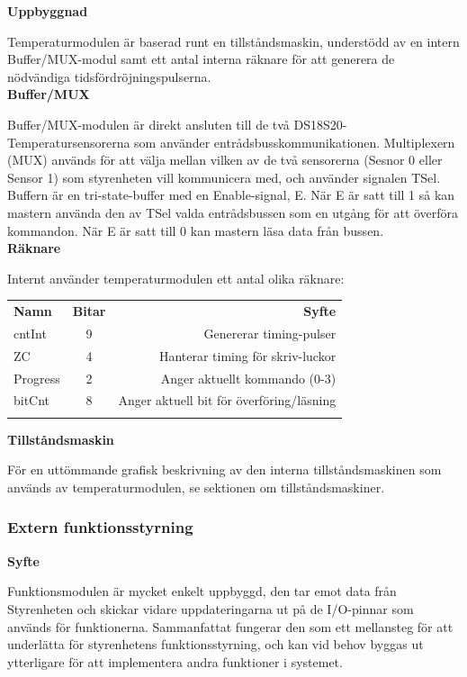 \documentclass[a4paper,11pt]{article}
\begin{document}
{\noindent \bf Uppbyggnad}

Temperaturmodulen är baserad runt en tillståndsmaskin, understödd av en intern Buffer/MUX-modul samt 
ett antal interna räknare för att generera de nödvändiga tidsfördröjningspulserna.\\

{\noindent \bf Buffer/MUX}

Buffer/MUX-modulen är direkt ansluten till de två DS18S20-Temperatursensorerna som använder entrådsbusskommunikationen.
Multiplexern (MUX) används för att välja mellan vilken av de två sensorerna (Sesnor 0 eller Sensor 1) som styrenheten
vill kommunicera med, och använder signalen TSel.
Buffern är en tri-state-buffer med en Enable-signal, E. När E är satt till 1 så kan mastern använda den av TSel valda
entrådsbussen som en utgång för att överföra kommandon. När E är satt till 0 kan mastern läsa data från bussen.\\

{\noindent \bf Räknare}

Internt använder temperaturmodulen ett antal olika räknare: \\
	\begin{tabular}{l c r}
		\\{\bf Namn} & {\bf Bitar} & {\bf Syfte}\\
		cntInt & 9 & Genererar timing-pulser\\
		ZC & 4 & Hanterar timing för skriv-luckor\\
		Progress & 2 & Anger aktuellt kommando (0-3)\\
		bitCnt & 8 & Anger aktuell bit för överföring/läsning\\\\
	\end{tabular}

{\noindent \bf Tillståndsmaskin}

För en uttömmande grafisk beskrivning av den interna tillståndsmaskinen som används av temperaturmodulen,
se sektionen om tillståndsmaskiner.\\

		\subsubsection{Extern funktionsstyrning}

{\noindent \bf Syfte}

Funktionsmodulen är mycket enkelt uppbyggd, den tar emot data från Styrenheten och skickar vidare 
uppdateringarna ut på de I/O-pinnar som används för funktionerna. Sammanfattat fungerar den som ett
mellansteg för att underlätta för styrenhetens funktionsstyrning, och kan vid behov byggas ut ytterligare
för att implementera andra funktioner i systemet.
\end{document}
